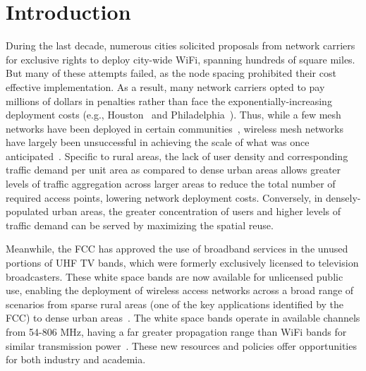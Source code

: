 \section{Introduction}
\label{sec:introduction}



During the last decade, numerous cities solicited proposals from network carriers for 
exclusive rights to deploy city-wide WiFi, spanning hundreds of square miles. But many 
of these attempts failed, as the node spacing prohibited their cost effective implementation. 
As a result, many network carriers opted to pay millions 
of dollars in penalties rather than face the exponentially-increasing deployment costs 
(e.g., Houston~\cite{cnet_aug07} and Philadelphia~\cite{arstechnica_may08}). 
Thus, while a few mesh networks have been deployed in certain communities~\cite{CRSK06},
wireless mesh networks have largely been unsuccessful in achieving the scale of what was 
once anticipated~\cite{taps}. Specific to rural areas, the lack of user density and 
corresponding traffic demand per unit area as compared to dense urban areas allows greater 
levels of traffic aggregation across larger areas to reduce the total number of required access points, lowering
network deployment costs. Conversely, in densely-populated urban areas, the greater concentration of users 
and higher levels of traffic demand can be served by maximizing the spatial reuse. 

Meanwhile, the FCC has approved the use of broadband services in the unused portions of 
UHF TV bands, which were formerly exclusively licensed to television broadcasters. 
These white space bands are now available for unlicensed public use, enabling the deployment 
of wireless access networks across a broad range of scenarios from sparse rural areas 
(one of the key applications identified by the FCC) to dense urban areas~\cite{carlson}. 
The white space bands operate in available channels from 54-806 MHz, having a far greater 
propagation range than WiFi bands for similar transmission power~\cite{balanis2012antenna}.
These new resources and policies offer opportunities for both industry and academia. 

